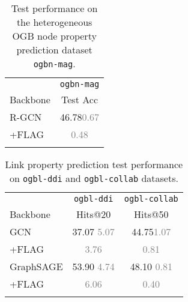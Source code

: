 \documentclass[11pt]{article}
\newcommand{\bftab}{\fontseries{b}\selectfont}
\begin{document}
 \begin{table}[ht] 
\caption{Test performance on the heterogeneous OGB node property prediction dataset \texttt{ogbn-mag}.}
        \centering
        \begin{tabular}{lc}
            \Xhline{2\arrayrulewidth}
            & \texttt{ogbn-mag} \\
            Backbone	& Test Acc  \\
            \hline\hline
            R-GCN & 46.78\textcolor{gray}{   {0.67}} \\
            +FLAG  & \bftab47.37\textcolor{gray}{   {0.48}}\\
            \Xhline{2\arrayrulewidth}
        \end{tabular}
\label{tab:mag}
\end{table} \begin{table}[ht] 
	\caption{Link property prediction test performance on \texttt{ogbl-ddi} and \texttt{ogbl-collab} datasets.}
\centering
\begin{tabular}{lcc}
\Xhline{2\arrayrulewidth}
 	       & \texttt{ogbl-ddi} & \texttt{ogbl-collab} \\
 Backbone	& Hits@20 & Hits@50  \\
\hline\hline
GCN &  37.07 \textcolor{gray}{    {5.07}}   			&  44.75\textcolor{gray}{    {1.07}}               \\
+FLAG & \bftab 51.41\textcolor{gray}{    {3.76}}              			&  \bftab46.22\textcolor{gray}{    {0.81}}     \\
\hline
GraphSAGE  & 53.90 \textcolor{gray}{    {4.74}} & 48.10 \textcolor{gray}{    {0.81}}    \\
+FLAG   & \bftab63.31\textcolor{gray}{    {6.06}}  & \bftab 48.44\textcolor{gray}{    {0.40}}    \\
\Xhline{2\arrayrulewidth}
	\end{tabular}

	\label{tab:link}
\end{table}
\end{document}
